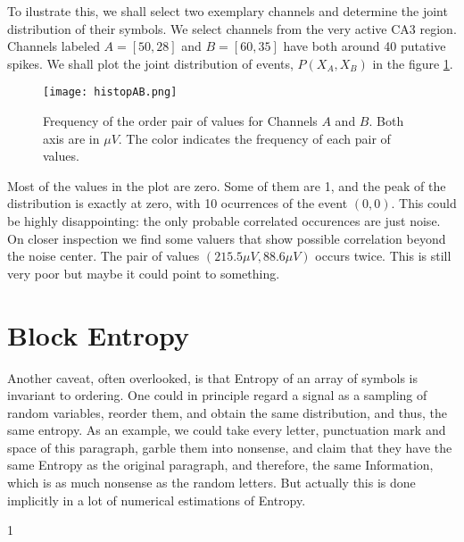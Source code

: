 \documentclass[10pt]{article}
\begin{document}
To ilustrate this, we shall select two exemplary channels and
determine the joint distribution of their symbols. We select channels from
the very active CA3 region. Channels labeled $A=[50,28]$ and $B=[60,35]$ have both
around 40 putative spikes. We shall plot the joint distribution of events,
$P(X_A, X_B)$ in the figure \ref{histopAB}.

\begin{figure}
  \begin{center}
    \texttt{[image: histopAB.png]}
  \end{center}
  \caption{Frequency of the order pair of values for Channels $A$ and $B$.
    Both axis are in $\mu V$.  The color indicates the frequency of each pair
  of values.}
  \label{histopAB}
\end{figure}

Most of the values in the plot are zero. Some of them are 1, and the peak of
the distribution is exactly at zero, with 10 ocurrences of the event $(0,0)$.
This could be highly disappointing: the only probable correlated occurences are
just noise. On closer inspection we find some valuers that show possible correlation
beyond the noise center. The pair of values $(215.5 \mu V, 88.6 \mu V)$ occurs twice.
This is still very poor but maybe it could point to something. 

\section{Block Entropy}

Another caveat, often overlooked, is that Entropy of an array of symbols is invariant to ordering. One could in principle regard a signal as a sampling of random variables, reorder them, and obtain the same distribution, and thus, the same entropy. As an example, we could take every letter, punctuation mark and space of this paragraph, garble them into nonsense, and claim that they have the same Entropy as the original paragraph, and therefore, the same Information, which is as much nonsense as the random letters. But actually this is done implicitly in a lot of numerical estimations of Entropy.


1
{}

\end{document}
